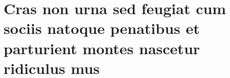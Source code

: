 \chapter{Cras non urna sed feugiat cum sociis natoque penatibus et 
parturient montes nascetur ridiculus mus}

\lipsum[31]
